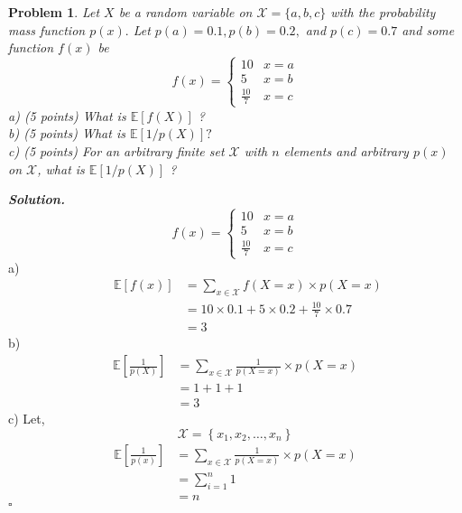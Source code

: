 \documentclass[11pt]{amsart}
\newtheorem{problem}{Problem}
\newenvironment{solution}[1][\it{Solution}]{\textbf{#1. } }{$\square$}
\theoremstyle{definition}
\begin{document}
\begin{problem}
Let $X$ be a random variable on $\mathcal{X}=\{a, b, c\}$ with the probability mass function $p(x) .$ Let $p(a)=0.1, p(b)=0.2,$ and $p(c)=0.7$ and some function $f(x)$ be
$$
f(x)=\left\{\begin{array}{ll}
10 & x=a \\
5 & x=b \\
\frac{10}{7} & x=c
\end{array}\right.
$$
a) (5 points) What is $\mathbb{E}[f(X)]$ ?\\
b) (5 points) What is $\mathbb{E}[1 / p(X)] ?$\\
c) (5 points) For an arbitrary finite set $\mathcal{X}$ with $n$ elements and arbitrary $p(x)$ on $\mathcal{X}$, what is $\mathbb{E}[1 / p(X)]$ ?
\end{problem}
\begin{solution}
$$
f(x)=\left\{\begin{array}{ll}
10 & x=a \\
5 & x=b \\
\frac{10}{7} & x=c
\end{array}\right.
$$
a)
\begin{align*}
\qquad \mathbb{E}[f(x)] & =\sum_{x \in \mathcal{X}} f(X=x) \times p(X=x) \\
& = 10 \times 0.1+5 \times 0.2+\frac{10}{7} \times 0.7 \\
& = \boxed{3}
\end{align*}
b)
\begin{align*}
\mathbb{E}\left[\frac{1}{p(X)}\right] &=\sum_{x \in \mathcal{X}} \frac{1}{p(X=x)} \times p(X = x) \\
&=1+1+1 \\
&=\boxed{3}
\end{align*}
c)
Let, 
$$
\mathcal{X} = \left\{x_{1}, x_{2}, \ldots, x_{n}\right\}
$$
\begin{align*}
\mathbb{E}\left[\frac{1}{p(x)}\right] &=\sum_{x \in \mathcal{X}} \frac{1}{p(X=x)} \times p(X=x) \\
&=\sum_{i=1}^{n} 1 \\
&=\boxed{n}
\end{align*}
\end{solution}
\end{document}
